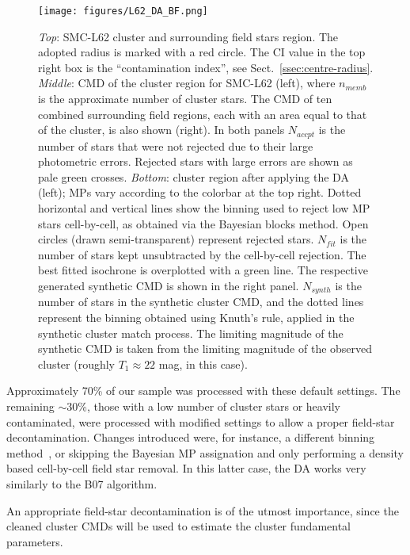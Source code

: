 \documentclass[draft]{aa}
\begin{document}
\begin{figure}
\centering
\texttt{[image: figures/L62\_DA\_BF.png]}
\caption{\emph{Top}: SMC-L62 cluster and surrounding field stars
region. The adopted radius is marked with a red circle. The CI value in the top
right box is the ``contamination index'', see Sect.~\ref{ssec:centre-radius}.
%
\emph{Middle}: CMD of the cluster region for SMC-L62 (left),
where $n_{memb}$ is the approximate number of cluster stars. The CMD
of ten combined surrounding field regions, each with an area equal to
that of the cluster, is also shown (right).
In both panels $N_{accpt}$ is the number of stars that were not rejected due to
their large photometric errors. Rejected stars with large errors are shown as
pale green crosses.
%
\emph{Bottom}: cluster region after applying the DA (left); MPs vary
according to the colorbar at the top right. Dotted horizontal and vertical lines
show the binning used to reject low MP stars cell-by-cell, as obtained via the
Bayesian blocks method. Open circles (drawn semi-transparent) represent rejected
stars.
$N_{fit}$ is the number of stars kept unsubtracted by the cell-by-cell
rejection. The best fitted isochrone is overplotted with a green line. 
The respective generated synthetic CMD is shown in the right panel. $N_{synth}$
is the number of stars in the synthetic cluster CMD, and the dotted lines
represent the binning obtained using Knuth's rule, applied in the synthetic
cluster match process. The limiting magnitude of the synthetic CMD is
taken from the limiting magnitude of the observed cluster (roughly
$T_1{\approx}22$ mag, in this case).}
\label{fig:DA_BF}
\end{figure}

Approximately 70\% of our sample was processed with these default settings.
The remaining ${\sim}$30\%, those with a low number of cluster stars
or heavily contaminated, were processed with modified settings to allow a proper
field-star decontamination.
Changes introduced were, for instance, a different binning
method~\citep[often a rectangular grid using Scott's rule,][]{Scott_1979},
or skipping the Bayesian MP assignation and only performing a density based
cell-by-cell field star removal. In this latter case, the DA works very
similarly to the B07 algorithm.

An appropriate field-star decontamination is of the utmost importance, since the
cleaned cluster CMDs will be used to estimate the cluster fundamental parameters.


\end{document}
